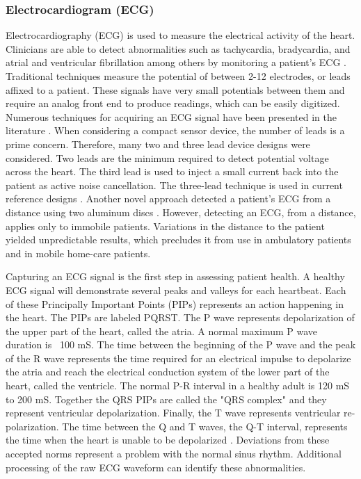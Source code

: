 \subsubsection{Electrocardiogram (ECG)}
\label{subsubsec:Electrocardiogram}
Electrocardiography (ECG) is used to measure the electrical activity of the heart. Clinicians are able to detect abnormalities such as tachycardia, bradycardia, and atrial and ventricular fibrillation among others by monitoring a patient's ECG . Traditional techniques measure the potential of between 2-12 electrodes, or leads affixed to a patient. These signals have very small potentials between them and require an analog front end to produce readings, which can be easily digitized. Numerous techniques for acquiring an ECG signal have been presented in the literature \cite{Kim2011} \cite{Yan2011} \cite{Faggion2011} \cite{Secerbegovic2011}.  When considering a compact sensor device, the number of leads is a prime concern. Therefore, many two and three lead device designs were considered. Two leads are the minimum required to detect potential voltage across the heart. The third lead is used to inject a small current back into the patient as active noise cancellation. The three-lead technique is used in current reference designs \cite{TI2006} . Another novel approach detected a patient's ECG from a distance using two aluminum discs \cite{Belgacem2011}. However, detecting an ECG, from a distance, applies only to immobile patients. Variations in the distance to the patient yielded unpredictable results, which precludes it from use in ambulatory patients and in mobile home-care patients. 

Capturing an ECG signal is the first step in assessing patient health. A healthy ECG signal will demonstrate several peaks and valleys for each heartbeat. Each of these Principally Important Points (PIPs) represents an action happening in the heart. The PIPs are labeled PQRST. The P wave represents depolarization of the upper part of the heart, called the atria. A normal maximum P wave duration is ~100 mS. The time between the beginning of the P wave and the peak of the R wave represents the time required for an electrical impulse to depolarize the atria and reach the electrical conduction system of the lower part of the heart, called the ventricle. The normal P-R interval in a healthy adult is 120 mS to 200 mS. Together the QRS PIPs are called the "QRS complex" and they represent ventricular depolarization. Finally, the T wave represents ventricular re-polarization. The time between the Q and T waves, the Q-T interval, represents the time when the heart is unable to be depolarized \cite{Khorovets2000}. Deviations from these accepted norms represent a problem with the normal sinus rhythm. Additional processing of the raw ECG waveform can identify these abnormalities.

